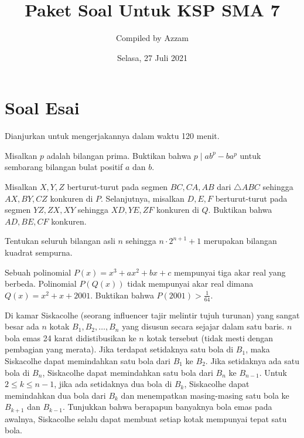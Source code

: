 \documentclass[11pt]{scrartcl}
\begin{document}
	\title{Paket Soal Untuk KSP SMA 7} %
	\date{Selasa, 27 Juli 2021}
	\author{Compiled by Azzam}
	\maketitle
	
	
	\section{Soal Esai}
	Dianjurkan untuk mengerjakannya dalam waktu 120 menit.
	\begin{soalbaru} 
			Misalkan $p$ adalah bilangan prima. Buktikan bahwa $p \mid ab^p - ba^p$ untuk sembarang bilangan bulat positif $a$ dan $b$.
		\end{soalbaru}
		
		
		\begin{soalbaru}
				Misalkan $X,Y,Z$ berturut-turut pada segmen $BC,CA,AB$ dari $\triangle ABC$ sehingga $AX, BY, CZ$ konkuren di $P$. Selanjutnya, misalkan $D,E,F$ berturut-turut pada segmen $YZ,ZX,XY$ sehingga $XD,YE,ZF$ konkuren di $Q$. Buktikan bahwa $AD,BE,CF$ konkuren.
			\end{soalbaru}

	\begin{soalbaru}
		Tentukan seluruh bilangan asli $n$ sehingga $n\cdot 2^{n+1}+1$ merupakan bilangan kuadrat sempurna.
	\end{soalbaru}

	\begin{soalbaru}
		Sebuah polinomial $P(x)=x^3+ax^2+bx+c$ mempunyai tiga akar real yang berbeda. Polinomial $P(Q(x))$ tidak mempunyai akar real dimana $Q(x)=x^2+x+2001$. Buktikan bahwa $P(2001)>\frac{1}{64}$.
	\end{soalbaru}

	
	\begin{soalbaru}
	Di kamar Siskacolhe (seorang influencer tajir melintir tujuh turunan) yang sangat besar ada $n$ kotak $B_1,B_2,\dots,B_n$ yang disusun secara sejajar dalam satu baris. $n$ bola emas 24 karat didistibusikan ke $n$ kotak tersebut (tidak mesti dengan pembagian yang merata). Jika terdapat setidaknya satu bola di $B_1$, maka Siskacolhe dapat memindahkan satu bola dari $B_1$ ke $B_2$. Jika setidaknya ada satu bola di $B_n$, Siskacolhe dapat memindahkan satu bola dari $B_n$ ke $B_{n-1}$. Untuk $2 \le k \le n-1$, jika ada setidaknya dua bola di $B_k$, Siskacolhe dapat memindahkan dua bola dari $B_k$ dan menempatkan masing-masing satu bola ke $B_{k+1}$ dan $B_{k-1}$. Tunjukkan bahwa berapapun banyaknya bola emas pada awalnya, Siskacolhe selalu dapat membuat setiap kotak mempunyai tepat satu bola.
	\end{soalbaru}

	
\end{document}
